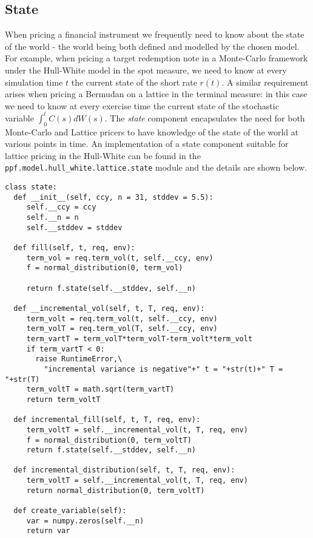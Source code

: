 \subsection{State} 

When pricing a financial instrument we frequently need to know about
the state of the world - the world being both defined and modelled by
the chosen model. For example, when pricing a target redemption note in
a Monte-Carlo framework under the Hull-White model in the spot measure,
we need to know at every simulation time $t$ the current state of the
short rate $r(t)$. A similar requirement arises when pricing a
Bermudan on a lattice in the terminal measure: in this case we need to
know at every exercise time the current state of the stochastic
variable $\int_0^t C(s) dW(s)$. The \emph{state} component encapsulates
the need for both Monte-Carlo and Lattice pricers to have knowledge of
the state of the world at various points in time. An implementation of
a state component suitable for lattice pricing in the Hull-White can
be found in the \verb|ppf.model.hull_white.lattice.state| module and
the details are shown below.

\begin{verbatim}
class state:
  def __init__(self, ccy, n = 31, stddev = 5.5):
     self.__ccy = ccy
     self.__n = n
     self.__stddev = stddev

  def fill(self, t, req, env):
     term_vol = req.term_vol(t, self.__ccy, env)
     f = normal_distribution(0, term_vol)

     return f.state(self.__stddev, self.__n)

  def __incremental_vol(self, t, T, req, env):
     term_volt = req.term_vol(t, self.__ccy, env)
     term_volT = req.term_vol(T, self.__ccy, env)
     term_vartT = term_volT*term_volT-term_volt*term_volt
     if term_vartT < 0:
       raise RuntimeError,\
         "incremental variance is negative"+" t = "+str(t)+" T = "+str(T)
     term_voltT = math.sqrt(term_vartT)
     return term_voltT      

  def incremental_fill(self, t, T, req, env):
     term_voltT = self.__incremental_vol(t, T, req, env)
     f = normal_distribution(0, term_voltT)     
     return f.state(self.__stddev, self.__n)

  def incremental_distribution(self, t, T, req, env):
     term_voltT = self.__incremental_vol(t, T, req, env)
     return normal_distribution(0, term_voltT)

  def create_variable(self):
     var = numpy.zeros(self.__n)
     return var  
\end{verbatim}

